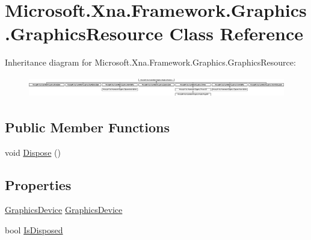 \hypertarget{class_microsoft_1_1_xna_1_1_framework_1_1_graphics_1_1_graphics_resource}{}\section{Microsoft.\+Xna.\+Framework.\+Graphics.\+Graphics\+Resource Class Reference}
\label{class_microsoft_1_1_xna_1_1_framework_1_1_graphics_1_1_graphics_resource}
Inheritance diagram for Microsoft.\+Xna.\+Framework.\+Graphics.\+Graphics\+Resource\+:\begin{figure}[H]
\begin{center}
\leavevmode
\includegraphics[height=0.922190cm]{class_microsoft_1_1_xna_1_1_framework_1_1_graphics_1_1_graphics_resource}
\end{center}
\end{figure}
\subsection*{Public Member Functions}
\begin{DoxyCompactItemize}
\item 
void \hyperlink{class_microsoft_1_1_xna_1_1_framework_1_1_graphics_1_1_graphics_resource_ac42cf2d3d99e9ce25e5edcc1f6f4232b}{Dispose} ()
\end{DoxyCompactItemize}
\subsection*{Properties}
\begin{DoxyCompactItemize}
\item 
\hyperlink{class_microsoft_1_1_xna_1_1_framework_1_1_graphics_1_1_graphics_device}{Graphics\+Device} \hyperlink{class_microsoft_1_1_xna_1_1_framework_1_1_graphics_1_1_graphics_resource_a28226ae3e3f7cdb8e507e1ceee36d185}{Graphics\+Device}
\item 
bool \hyperlink{class_microsoft_1_1_xna_1_1_framework_1_1_graphics_1_1_graphics_resource_a53255ea6b6f90fe463591f8383a3788a}{Is\+Disposed}
\end{DoxyCompactItemize}


